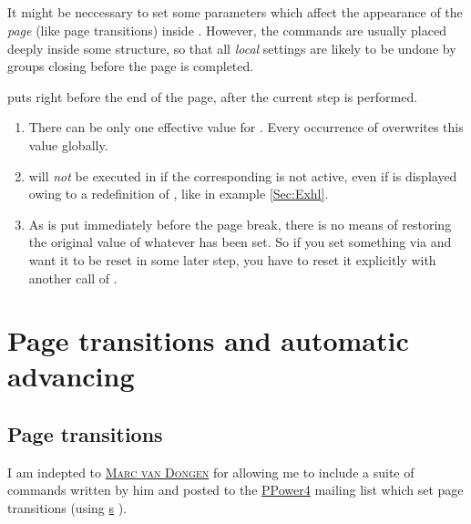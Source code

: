\documentclass[12pt]{scrartcl}
\let\name=\textsc
\let\newslide=\relax
\begin{document}
  \subsection{}%
  It might be neccessary to set some parameters which affect the appearance of the \emph{page} (like page transitions)
  inside . However, the  commands are usually placed deeply inside some structure, so
  that all \emph{local} settings are likely to be undone by groups closing before the page is completed.

   puts  right before the end of the page, after the
  current step is performed.

  \newslide

  \begin{enumerate}
  \item There can be only one effective value for . Every occurrence of  overwrites
    this value globally.

  \item {} will \emph{not} be executed in  if the corresponding 
    is not active, even if  is displayed owing to a redefinition of ,
    like in example \ref{Sec:Exhl}.

  \item As  is put immediately before the page break, there is no means of restoring the original value
    of whatever has been set. So if you set something via  and want it to be reset in some later
    step, you have to reset it explicitly with another call of .
  \end{enumerate}

  \newslide

  \section{Page transitions and automatic advancing}\label{Sec:PageTrans}
  \subsection{Page transitions}
  I am indepted to \href{mailto:dongen@cs.ucc.ie}{\name{Marc van Dongen}} for allowing me to include a suite of commands
  written by him and posted to the \href{http://www-sp.iti.informatik.tu-darmstadt.de/software/ppower4/}{PPower4}
  mailing list which set page transitions (using
  \href{ftp://ftp.dante.de/tex-archive/help/Catalogue/entries/hyperref.html}{s} ).
\end{document}
